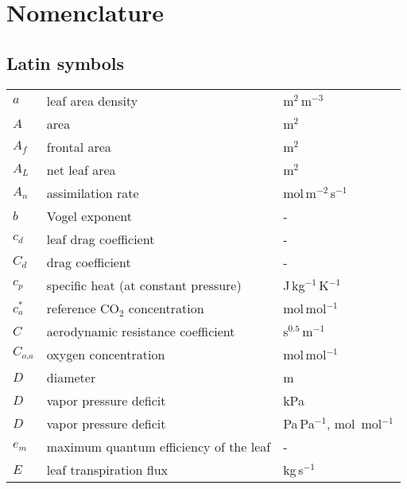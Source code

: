 \chapter{Nomenclature}


\section*{Latin symbols}
\begin{longtable}{p{}p{}p{}}
	$a$ & leaf area density & m$^2$\,m$^{-3}$ \\ 	
	$A$ & area & m$^2$ \\ 		
	$A_f$ & frontal area & m$^2$ \\ 		
	$A_L$ & net leaf area & m$^2$ \\ 			
	$A_n$ & assimilation rate & mol\,m$^{-2}$\,s$^{-1}$ \\ 	
	$b$ & Vogel exponent & - \\ 	
	$c_d$ & leaf drag coefficient & - \\ 	
	$C_d$ & drag coefficient & - \\ 		
	$c_p$ & specific heat (at constant pressure) & J\,kg$^{-1}$\,K$^{-1}$ \\ 
	$c_a^*$ & reference CO$_2$ concentration & mol\,mol$^{-1}$ \\ 
	$C$ & aerodynamic resistance coefficient & s$^{0.5}$\,m$^{-1}$\\ 
	$C_{\textit{o,a}}$ & oxygen concentration & mol\,mol$^{-1}$ \\ 
	$D$ & diameter & m \\ 
	$D$ & vapor pressure deficit & kPa\\ 	
	$D$ & vapor pressure deficit & Pa\,Pa$^{-1}$, mol~mol$^{-1}$\\ 	
	$e_m$ & maximum quantum efficiency of the leaf & - \\ 
	$E$ & leaf transpiration flux & kg\,s$^{-1}$ \\


\end{longtable}
